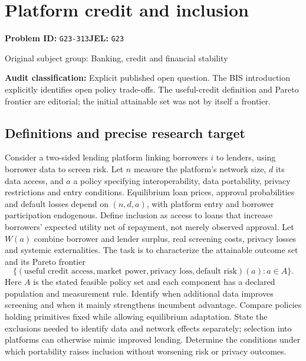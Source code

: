 \documentclass[11pt,a4paper]{article}
\begin{document}
\section*{Platform credit and inclusion}
\textbf{Problem ID:} \texttt{G23-313}\quad \textbf{JEL:} \texttt{G23}\par
\label{problem:OP-0328}
{\sffamily\small\color{muted}Original subject group: Banking, credit and financial stability\par}
\label{definitions:problem:30007610}
\textbf{Audit classification:} Explicit published open question. The BIS introduction explicitly identifies open policy trade-offs. The useful-credit definition and Pareto frontier are editorial; the initial attainable set was not by itself a frontier.
\subsection*{Definitions and precise research target}
Consider a two-sided lending platform linking borrowers \(i\) to lenders, using borrower data to screen risk. Let \(n\) measure the platform's network size, \(d\) its data access, and \(a\) a policy specifying interoperability, data portability, privacy restrictions and entry conditions. Equilibrium loan prices, approval probabilities and default losses depend on \((n,d,a)\), with platform entry and borrower participation endogenous. Define inclusion as access to loans that increase borrowers' expected utility net of repayment, not merely observed approval. Let \(W(a)\) combine borrower and lender surplus, real screening costs, privacy losses and systemic externalities. The task is to characterize the attainable outcome set and its Pareto frontier
\[\{(\text{useful credit access},\text{market power},\text{privacy loss},\text{default risk})(a):a\in A\}.\]
Here \(A\) is the stated feasible policy set and each component has a declared population and measurement rule. Identify when additional data improves screening and when it mainly strengthens incumbent advantage. Compare policies holding primitives fixed while allowing equilibrium adaptation. State the exclusions needed to identify data and network effects separately; selection into platforms can otherwise mimic improved lending. Determine the conditions under which portability raises inclusion without worsening risk or privacy outcomes.
\end{document}
